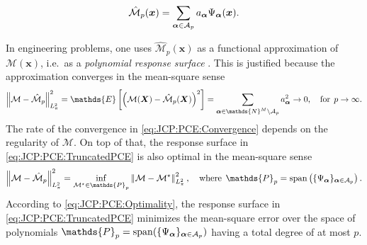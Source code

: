 \begin{equation} \label{eq:JCP:PCE:TruncatedPCE}
  \hat{\mathcal{M}}_p(\bm{x}) = \sum\limits_{\bm{\alpha} \in \mathcal{A}_p} a_{\bm{\alpha}} \Psi_{\bm{\alpha}}(\bm{x}).
\end{equation}
\par %
In engineering problems, one uses \(\hat{\mathcal{M}}_p(\bm{x})\) as a functional approximation of \(\mathcal{M}(\bm{x})\),
i.e.\ as a \emph{polynomial response surface} \cite{Statistics:Box2007}.
This is justified because the approximation converges in the mean-square sense
\begin{equation} \label{eq:JCP:PCE:Convergence}
  \left\lVert \mathcal{M}-\hat{\mathcal{M}}_p \right\rVert_{L_{\pi}^2}^2
  = \mathds{E} \left[ \left( \mathcal{M}(\bm{X}) - \hat{\mathcal{M}}_p(\bm{X}) \right)^2 \right]
  = \sum\limits_{\bm{\alpha} \in \mathds{N}^\dimParam  \setminus \mathcal{A}_p} \coeffM_{\bm{\alpha}}^2
  \rightarrow 0, \quad \text{for} \;\, p \rightarrow \infty.
\end{equation}
The rate of the convergence in \cref{eq:JCP:PCE:Convergence} depends on the regularity of \(\mathcal{M}\).
On top of that, the response surface in \cref{eq:JCP:PCE:TruncatedPCE} is also optimal in the mean-square sense
\begin{equation} \label{eq:JCP:PCE:Optimality}
  \left\lVert \mathcal{M}-\hat{\mathcal{M}}_p \right\rVert_{L_{\pi}^2}^2
  = \operatorname*{inf}_{\mathcal{M}^\star \in \mathds{P}_p} \left\lVert \mathcal{M}-\mathcal{M}^\star \right\rVert_{L_{\pi}^2}^2,
  \quad \text{where} \;\, \mathds{P}_p = \mathrm{span} \left( \{\basis_{\bm{\alpha}}\}_{\bm{\alpha} \in \mathcal{A}_p} \right).
\end{equation}
According to \cref{eq:JCP:PCE:Optimality}, the response surface in \cref{eq:JCP:PCE:TruncatedPCE} minimizes the mean-square error over the space of polynomials
\(\mathds{P}_p = \mathrm{span} (\{\basis_{\bm{\alpha}}\}_{\bm{\alpha} \in \mathcal{A}_p})\) having a total degree of at most \(p\).

